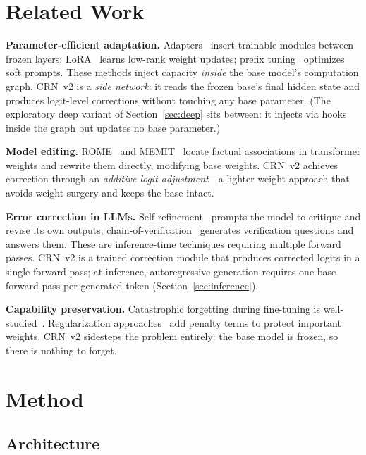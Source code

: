 \documentclass[11pt]{article}
\begin{document}
\section{Related Work}

\textbf{Parameter-efficient adaptation.}
Adapters~\cite{houlsby2019adapters} insert trainable modules between frozen layers; LoRA~\cite{lora} learns low-rank weight updates; prefix tuning~\cite{li2021prefix} optimizes soft prompts.
These methods inject capacity \emph{inside} the base model's computation graph.
CRN~v2 is a \emph{side network}: it reads the frozen base's final hidden state and produces logit-level corrections without touching any base parameter.
(The exploratory deep variant of Section~\ref{sec:deep} sits between: it injects via hooks inside the graph but updates no base parameter.)

\textbf{Model editing.}
ROME~\cite{meng2022rome} and MEMIT~\cite{meng2022memit} locate factual associations in transformer weights and rewrite them directly, modifying base weights.
CRN~v2 achieves correction through an \emph{additive logit adjustment}---a lighter-weight approach that avoids weight surgery and keeps the base intact.

\textbf{Error correction in LLMs.}
Self-refinement~\cite{madaan2023selfrefine} prompts the model to critique and revise its own outputs; chain-of-verification~\cite{dua2023chain} generates verification questions and answers them.
These are inference-time techniques requiring multiple forward passes.
CRN~v2 is a trained correction module that produces corrected logits in a single forward pass; at inference, autoregressive generation requires one base forward pass per generated token (Section~\ref{sec:inference}).

\textbf{Capability preservation.}
Catastrophic forgetting during fine-tuning is well-studied~\cite{mccloskey1989catastrophic}.
Regularization approaches~\cite{kirkpatrick2017episodic,li2018algorithmic} add penalty terms to protect important weights.
CRN~v2 sidesteps the problem entirely: the base model is frozen, so there is nothing to forget.

\section{Method}
\label{sec:method}

\subsection{Architecture}
\end{document}
